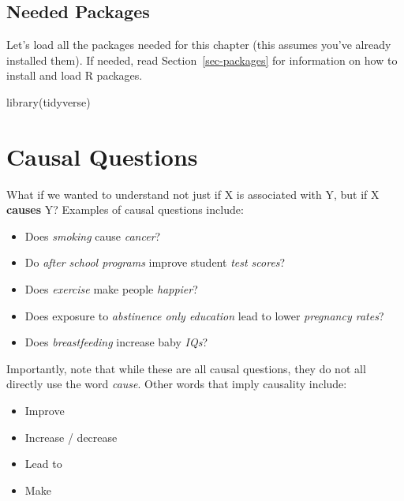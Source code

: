 \documentclass[
  letterpaper,
  DIV=11,
  numbers=noendperiod]{scrreprt}
\newenvironment{Shaded}{\begin{snugshade}}{\end{snugshade}}
\newcommand{\FunctionTok}[1]{\textcolor[rgb]{0.28,0.35,0.67}{#1}}
\newcommand{\NormalTok}[1]{\textcolor[rgb]{0.00,0.23,0.31}{#1}}
\providecommand{\tightlist}{%
  \setlength{\itemsep}{0pt}\setlength{\parskip}{0pt}}\usepackage{longtable,booktabs,array}
\theoremstyle{definition}
\theoremstyle{remark}
\begin{document}
\hypertarget{needed-packages-1}{%
\subsection*{Needed Packages}\label{needed-packages-1}}

Let's load all the packages needed for this chapter (this assumes you've
already installed them). If needed, read Section~\ref{sec-packages} for
information on how to install and load R packages.

\begin{Shaded}
\begin{Highlighting}[]
\FunctionTok{library}\NormalTok{(tidyverse)}
\end{Highlighting}
\end{Shaded}

\hypertarget{sec-causal-questions}{%
\section{Causal Questions}\label{sec-causal-questions}}

What if we wanted to understand not just if X is associated with Y, but
if X \textbf{causes} Y? Examples of causal questions include:

\begin{itemize}
\tightlist
\item
  Does \emph{smoking} cause \emph{cancer}?
\item
  Do \emph{after school programs} improve student \emph{test scores}?
\item
  Does \emph{exercise} make people \emph{happier}?
\item
  Does exposure to \emph{abstinence only education} lead to lower
  \emph{pregnancy rates}?
\item
  Does \emph{breastfeeding} increase baby \emph{IQs}?
\end{itemize}

Importantly, note that while these are all causal questions, they do not
all directly use the word \emph{cause}. Other words that imply causality
include:

\begin{itemize}
\tightlist
\item
  Improve
\item
  Increase / decrease
\item
  Lead to
\item
  Make
\end{itemize}
\end{document}
